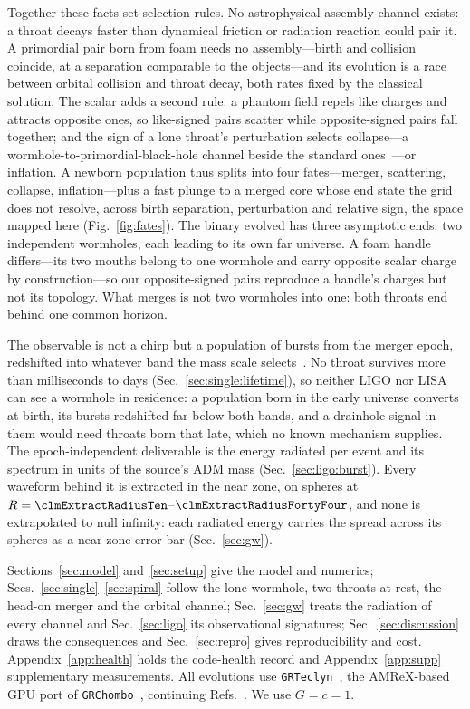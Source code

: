 \documentclass[twocolumn,floatfix,aps,prd,superscriptaddress,nofootinbib]{revtex4-2}
\begin{document}
Together these facts set selection rules. No astrophysical assembly channel exists: a throat decays faster than dynamical friction or radiation reaction could pair it. A primordial pair born from foam needs no assembly---birth and collision coincide, at a separation comparable to the objects---and its evolution is a race between orbital collision and throat decay, both rates fixed by the classical solution. The scalar adds a second rule: a phantom field repels like charges and attracts opposite ones, so like-signed pairs scatter while opposite-signed pairs fall together; and the sign of a lone throat's perturbation selects collapse---a wormhole-to-primordial-black-hole channel beside the standard ones~\cite{zeldovich1967,carr_hawking1974,carr2021}---or inflation. A newborn population thus splits into four fates---merger, scattering, collapse, inflation---plus a fast plunge to a merged core whose end state the grid does not resolve, across birth separation, perturbation and relative sign, the space mapped here (Fig.~\ref{fig:fates}). The binary evolved has three asymptotic ends: two independent wormholes, each leading to its own far universe. A foam handle differs---its two mouths belong to one wormhole and carry opposite scalar charge by construction---so our opposite-signed pairs reproduce a handle's charges but not its topology. What merges is not two wormholes into one: both throats end behind one common horizon.

The observable is not a chirp but a population of bursts from the merger epoch, redshifted into whatever band the mass scale selects~\cite{caprini2018,nanograv2023,lisa2017,lvk2021}. No throat survives more than milliseconds to days (Sec.~\ref{sec:single:lifetime}), so neither LIGO nor LISA~\cite{aligo2010,robson2019,thrane2013} can see a wormhole in residence: a population born in the early universe converts at birth, its bursts redshifted far below both bands, and a drainhole signal in them would need throats born that late, which no known mechanism supplies. The epoch-independent deliverable is the energy radiated per event and its spectrum in units of the source's ADM mass (Sec.~\ref{sec:ligo:burst}). Every waveform behind it is extracted in the near zone, on spheres at $R=\clmExtractRadiusTen$--$\clmExtractRadiusFortyFour$, and none is extrapolated to null infinity: each radiated energy carries the spread across its spheres as a near-zone error bar (Sec.~\ref{sec:gw}).

Sections~\ref{sec:model} and~\ref{sec:setup} give the model and numerics; Secs.~\ref{sec:single}--\ref{sec:spiral} follow the lone wormhole, two throats at rest, the head-on merger and the orbital channel; Sec.~\ref{sec:gw} treats the radiation of every channel and Sec.~\ref{sec:ligo} its observational signatures; Sec.~\ref{sec:discussion} draws the consequences and Sec.~\ref{sec:repro} gives reproducibility and cost. Appendix~\ref{app:health} holds the code-health record and Appendix~\ref{app:supp} supplementary measurements. All evolutions use \texttt{GRTeclyn}~\cite{grteclyn}, the AMReX-based~\cite{amrex} GPU port of \texttt{GRChombo}~\cite{grchombo}, continuing Refs.~\cite{shirokov2026,shirokov2026b}. We use $G=c=1$.
\end{document}
